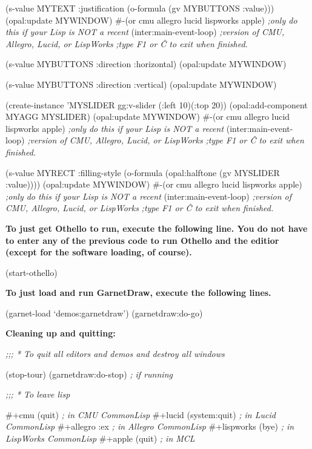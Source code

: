 \begin{programexample}
(s-value MYTEXT :justification (o-formula (gv MYBUTTONS :value)))
(opal:update MYWINDOW)
\#-(or cmu allegro lucid lispworks apple)  {\it ;only do this if your Lisp is NOT a recent}
(inter:main-event-loop)                   {\it ;version of CMU, Allegro, Lucid, or LispWorks}
                                          {\it ;type F1 or \^C to exit when finished.}

(s-value MYBUTTONS :direction :horizontal)
(opal:update MYWINDOW)

(s-value MYBUTTONS :direction :vertical)
(opal:update MYWINDOW)

(create-instance 'MYSLIDER gg:v-slider
  (:left 10)(:top 20))
(opal:add-component MYAGG MYSLIDER)
(opal:update MYWINDOW)
\#-(or cmu allegro lucid lispworks apple)  {\it ;only do this if your Lisp is NOT a recent}
(inter:main-event-loop)                   {\it ;version of CMU, Allegro, Lucid, or LispWorks}
                                          {\it ;type F1 or \^C to exit when finished.}

(s-value MYRECT :filling-style (o-formula
				(opal:halftone (gv MYSLIDER :value))))
(opal:update MYWINDOW)
\#-(or cmu allegro lucid lispworks apple)  {\it ;only do this if your Lisp is NOT a recent}
(inter:main-event-loop)                   {\it ;version of CMU, Allegro, Lucid, or LispWorks}
                                          {\it ;type F1 or \^C to exit when finished.}
\end{programexample}

{\bf To just get Othello to run, execute the following line.
You do not have to enter any of the previous code to run Othello and
the editior (except for the software loading, of course).}
\begin{programexample}

(start-othello)

\end{programexample}


{\bf To just load and run GarnetDraw, execute the following lines.}

\begin{programexample}

(garnet-load `demos:garnetdraw')
(garnetdraw:do-go)

\end{programexample}

{\bf Cleaning up and quitting:}
\begin{programexample}
{\it ;;; * To quit all editors and demos and destroy all windows}

(stop-tour)
(garnetdraw:do-stop)   {\it ; if running}

{\it ;;; * To leave lisp}

\#+cmu   (quit)         {\it ; in CMU CommonLisp}
\#+lucid (system:quit)  {\it ; in Lucid CommonLisp}
\#+allegro :ex          {\it ; in Allegro CommonLisp}
\#+lispworks (bye)      {\it ; in LispWorks CommonLisp}
\#+apple (quit)         {\it ; in MCL}

\end{programexample}


